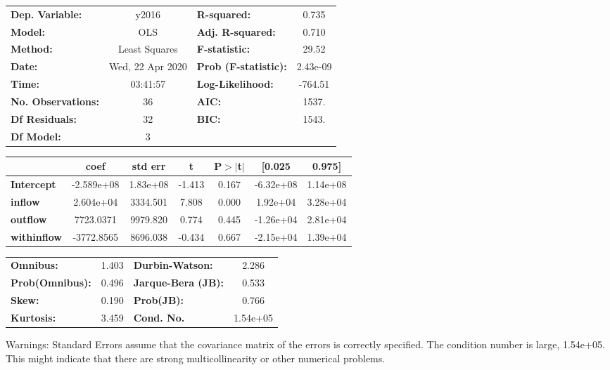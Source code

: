 \begin{center}
\begin{tabular}{lclc}
\toprule
\textbf{Dep. Variable:}    &      y2016       & \textbf{  R-squared:         } &     0.735   \\
\textbf{Model:}            &       OLS        & \textbf{  Adj. R-squared:    } &     0.710   \\
\textbf{Method:}           &  Least Squares   & \textbf{  F-statistic:       } &     29.52   \\
\textbf{Date:}             & Wed, 22 Apr 2020 & \textbf{  Prob (F-statistic):} &  2.43e-09   \\
\textbf{Time:}             &     03:41:57     & \textbf{  Log-Likelihood:    } &   -764.51   \\
\textbf{No. Observations:} &          36      & \textbf{  AIC:               } &     1537.   \\
\textbf{Df Residuals:}     &          32      & \textbf{  BIC:               } &     1543.   \\
\textbf{Df Model:}         &           3      & \textbf{                     } &             \\
\bottomrule
\end{tabular}
\begin{tabular}{lcccccc}
                    & \textbf{coef} & \textbf{std err} & \textbf{t} & \textbf{P$> |$t$|$} & \textbf{[0.025} & \textbf{0.975]}  \\
\midrule
\textbf{Intercept}  &   -2.589e+08  &     1.83e+08     &    -1.413  &         0.167        &    -6.32e+08    &     1.14e+08     \\
\textbf{inflow}     &    2.604e+04  &     3334.501     &     7.808  &         0.000        &     1.92e+04    &     3.28e+04     \\
\textbf{outflow}    &    7723.0371  &     9979.820     &     0.774  &         0.445        &    -1.26e+04    &     2.81e+04     \\
\textbf{withinflow} &   -3772.8565  &     8696.038     &    -0.434  &         0.667        &    -2.15e+04    &     1.39e+04     \\
\bottomrule
\end{tabular}
\begin{tabular}{lclc}
\textbf{Omnibus:}       &  1.403 & \textbf{  Durbin-Watson:     } &    2.286  \\
\textbf{Prob(Omnibus):} &  0.496 & \textbf{  Jarque-Bera (JB):  } &    0.533  \\
\textbf{Skew:}          &  0.190 & \textbf{  Prob(JB):          } &    0.766  \\
\textbf{Kurtosis:}      &  3.459 & \textbf{  Cond. No.          } & 1.54e+05  \\
\bottomrule
\end{tabular}
\end{center}

Warnings: \newline
 [1] Standard Errors assume that the covariance matrix of the errors is correctly specified. \newline
 [2] The condition number is large, 1.54e+05. This might indicate that there are \newline
 strong multicollinearity or other numerical problems.